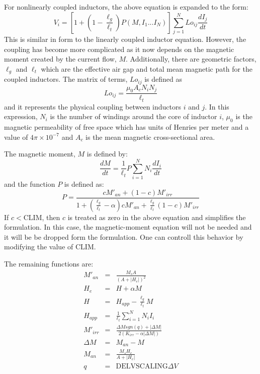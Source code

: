 For nonlinearly coupled inductors, the above equation is expanded to the form:
\begin{equation}
V_{i} = \left[1 + \left(1-\frac{\ell_g}{\ell_t}\right)P(M,I_{1} ... I_{N})\right]\sum_{j=1}^{N} Lo_{ij} \frac{dI_{j}}{dt}
\label{nonlinMIRelation}
\end{equation}
This is similar in form to the linearly coupled inductor equation.  However,
the coupling has become more complicated as it now depends on the magnetic moment
created by the current flow, $M$.  Additionally, there are geometric factors,
$\ell_{g}$ and $\ell_{t}$ which are the effective air gap and total mean magnetic
path for the coupled inductors. The matrix of terms, $Lo_{ij}$ is defined as
\begin{equation}
Lo_{ij}=\frac{\mu_0 A_c N_i N_j}{\ell_t}
\end{equation}
and it represents the physical coupling between inductors $i$ and $j$.  In this
expression, $N_i$ is the number of windings around the core of inductor $i$,
$\mu_0$ is the magnetic permeability of free space which has units of Henries per meter
and a value of $4\pi \times 10^{-7}$ and $A_c$ is the mean magnetic cross-sectional area.

The magnetic moment, $M$ is defined by:
\begin{equation}
\frac{dM}{dt} = \frac{1}{\ell_t} P \sum_{i=1}^{N} N_i \frac{dI_i}{dt}
\end{equation}
and the function $P$ is defined as:
\begin{equation}
P = \frac{c M'_{an} + (1-c)M'_{irr}}{1 + \left(\frac{\ell_g}{\ell_t}-\alpha\right) c M'_{an} + \frac{\ell_g}{\ell_t}(1-c)M'_{irr}}
\end{equation}
If $c < \mbox{CLIM}$, then $c$ is treated as zero in the above equation and \Xyce\/ 
simplifies the formulation.  In this case, the magnetic-moment equation will not be 
needed and it will be be dropped form the formulation.  One can controll this behavior by
modifying the value of $\mbox{CLIM}$.

The remaining functions are:
\begin{eqnarray}
M'_{an} & = & \frac{M_s A}{\left(A + |H_e|\right)^2} \\
H_e & = & H + \alpha M \\
H & = & H_{app} - \frac{\ell_g}{\ell_t}M  \\
H_{app} & = & \frac{1}{\ell_t}\sum_{i=1}^{N} N_i I_i \\
M'_{irr} & = & \frac{\Delta M sgn(q) + |\Delta M|}{2\left(K_{irr} - \alpha |\Delta  M|\right)} \\
\Delta M & = & M_{an} - M \\
M_{an} & = & \frac{M_s H_e}{A + |H_e|} \\
q & = & \mbox{DELVSCALING}  \Delta V
\end{eqnarray}

